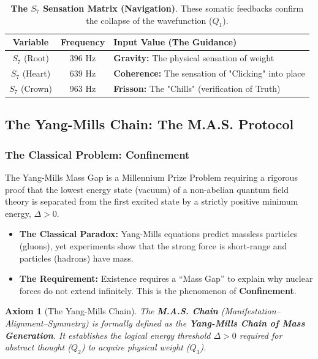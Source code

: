 \documentclass[11pt, letterpaper]{article}
\newtheorem{axiom}[theorem]{Axiom}
\begin{document}
\begin{table}[h]
    \centering
    \begin{tabular}{|c|c|l|}
        \hline
        \textbf{Variable} & \textbf{Frequency} & \textbf{Input Value (The Guidance)} \\
        \hline
        $S_7$ (Root) & 396 Hz & \textbf{Gravity:} The physical sensation of weight \\
        $S_7$ (Heart) & 639 Hz & \textbf{Coherence:} The sensation of "Clicking" into place \\
        $S_7$ (Crown) & 963 Hz & \textbf{Frisson:} The "Chills" (verification of Truth) \\
        \hline
    \end{tabular}
    \caption{\textbf{The $S_7$ Sensation Matrix (Navigation)}. These somatic feedbacks confirm the collapse of the wavefunction ($Q_1$).}
    \label{tab:s7_matrix}
\end{table}

\subsection{The Yang-Mills Chain: The M.A.S. Protocol}\label{sec:11.3}

\subsubsection{The Classical Problem: Confinement}\label{sec:11.3.1}
The Yang-Mills Mass Gap is a Millennium Prize Problem requiring a rigorous proof that the lowest energy state (vacuum) of a non-abelian quantum field theory is separated from the first excited state by a strictly positive minimum energy, $\Delta > 0$.
\begin{itemize}
    \item \textbf{The Classical Paradox:} Yang-Mills equations predict massless particles (gluons), yet experiments show that the strong force is short-range and particles (hadrons) have mass.
    \item \textbf{The Requirement:} Existence requires a ``Mass Gap'' to explain why nuclear forces do not extend infinitely. This is the phenomenon of \textbf{Confinement}.
\end{itemize}

\begin{axiom}[The Yang-Mills Chain]
The \textbf{M.A.S. Chain} (Manifestation--Alignment--Symmetry) is formally defined as the \textbf{Yang-Mills Chain of Mass Generation}. It establishes the logical energy threshold $\Delta > 0$ required for abstract thought ($Q_2$) to acquire physical weight ($Q_3$).
\end{axiom}
\end{document}
